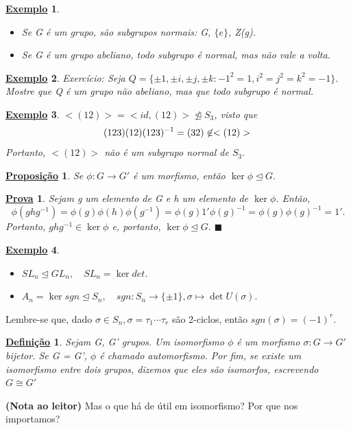 \documentclass{article}
\newtheorem*{def*}{\underline{Defini\c c\~ao}}
\newtheorem*{prop*}{\underline{Proposi\c c\~ao}}
\newtheorem{example*}{\underline{Exemplo}}
\newtheorem*{proof*}{\underline{Prova}}
\renewcommand\qedsymbol{$\blacksquare$}
\begin{document}
\begin{example*}
 \begin{itemize}
   \item[1)] Se G \'e um grupo, s\~ao subgrupos normais: G, $\{e\}$, Z(g).
   \item[2)] Se G \'e um grupo abeliano, todo subgrupo \'e normal, mas n\~ao vale a volta.
 \end{itemize}
\end{example*}
 \begin{example*}
   Exerc\'icio: Seja $Q = \{\pm1, \pm i, \pm j, \pm k: -1^{2} = 1, i^{2} = j^{2} = k^{2} = -1\}.$ Mostre que Q \'e um grupo
n\~ao abeliano, mas que todo subgrupo \'e normal.
 \end{example*}
\begin{example*}
  $<(12)> = <id, (12)>\not\trianglelefteq{S_{3}}$, visto que 
  $$
    (123)(12)(123)^{-1} = (32)\not\in <(12)>\\
  $$
  Portanto, $<(12)>$ n\~ao \'e um subgrupo normal de $S_{3}.$
\end{example*}
 \begin{prop*}
   Se $\phi:G\rightarrow G'$ \'e um morfismo, ent\~ao $\ker{\phi}\trianglelefteq{G}.$
 \end{prop*}
\begin{proof*}
  Sejam g um elemento de G e h um elemento de $\ker{\phi}$. Ent\~ao, 
    $$
      \phi(ghg^{-1}) = \phi(g)\phi(h)\phi(g^{-1}) = \phi(g)1'\phi(g)^{-1} = \phi(g)\phi(g)^{-1} = 1'.
    $$
    Portanto, $ghg^{-1}\in\ker{\phi}$ e, portanto, $\ker{\phi}\trianglelefteq{G}.$ \qedsymbol
\end{proof*}
 \begin{example*}
  \begin{itemize}
    \item[1)] $SL_{n}\trianglelefteq{GL_{n}}, \quad SL_{n} = \ker{det}.$
    \item[2)] $A_{n} = \ker{sgn}\trianglelefteq{S_{n}}, \quad sgn:S_{n}\rightarrow\{\pm 1\}, \sigma\mapsto \det{U(\sigma)}.$
  \end{itemize}
 \end{example*}
 Lembre-se que, dado $\sigma\in S_{n}, \sigma = \tau_{1}\cdots\tau_{r}$ s\~ao 2-ciclos, ent\~ao $sgn(\sigma) = (-1)^{r}.$
\begin{def*}
  Sejam G, G' grupos. Um isomorfismo $\phi$ \'e um morfismo $\sigma:G\rightarrow G'$ bijetor. Se G = G', $\phi$ \'e chamado automorfismo.
Por fim, se existe um isomorfismo entre dois grupos, dizemos que eles s\~ao isomorfos, escrevendo $G\cong G'$
\end{def*}
\textbf{(Nota ao leitor)} Mas o que h\'a de \'util em isomorfismo? Por que nos importamos? 
\end{document}
